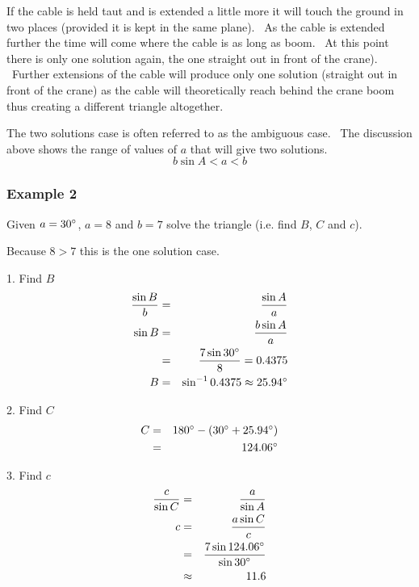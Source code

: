 If the cable is held taut and is extended a little more it will touch the ground in two places (provided it is kept in the same plane).
\ As the cable is extended further the time will come where the cable is as long as boom. \ At
this point there is only one solution again, the one straight out in front of the crane). \ Further extensions
of the cable will produce only one solution (straight out in front of the crane) as the cable will theoretically reach behind the crane boom thus creating
a different triangle altogether. 

The two solutions case is often referred to as the ambiguous case. \ The
discussion above shows the range of values of $a$ that will give two solutions.
\begin{equation*}b \sin  A <a <b
\end{equation*}

\subsubsection{Example 2}
Given $a =30 \mbox{{\ensuremath{{}^\circ}}}$, $a =8$ and $b =7$ solve the triangle (i.e. find $B$, $C$ and $c$). 

   
\setlength\fboxrule{0in}\setlength\fboxsep{0.2in}


Because $8 >7$ this is the one solution case. 

1. Find $B$
\begin{align*}\frac{\sin  B}{b} &  = & \frac{\sin  A}{a} \\
\sin  B &  = & \frac{b \sin  A}{a} \\
 &  = & \frac{7 \sin  30 \mbox{{\ensuremath{{}^\circ}}}}{8} =0.4375 \\
B &  = & \sin ^{ -1} 0.4375 \approx 25.94 \mbox{{\ensuremath{{}^\circ}}}\end{align*}

2. Find $C$
\begin{align*}C &  = & 180 \mbox{{\ensuremath{{}^\circ}}} -(30 \mbox{{\ensuremath{{}^\circ}}} +25.94 \mbox{{\ensuremath{{}^\circ}}}) \\
 &  = & 124.06 \mbox{{\ensuremath{{}^\circ}}}\end{align*}

3. Find $c$
\begin{align*}\frac{c}{\sin  C} &  = & \frac{a}{\sin  A} \\
c &  = & \frac{a \sin  C}{c} \\
 &  = & \frac{7 \sin  124.06 \mbox{{\ensuremath{{}^\circ}}}}{\sin  30 \mbox{{\ensuremath{{}^\circ}}}} \\
 &  \approx  & 11.6\end{align*}

